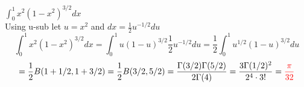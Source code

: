 \item [4.] \( \displaystyle \int_0^1 x^2(1-x^2)^{3/2}dx\)
\\[2mm]Using u-sub let $u=x^2$ and $dx = \frac{1}{2}u^{-1/2}du$
\[
    \int_0^1 x^2(1-x^2)^{3/2}dx
    = \int_0^1 u(1-u)^{3/2}\frac{1}{2}u^{-1/2}du
    = \frac{1}{2}\int_0^1 u^{1/2}(1-u)^{3/2}du
\]
\[
    = \frac{1}{2}B(1+1/2,1+3/2)=\frac{1}{2}B(3/2,5/2)=\frac{\Gamma(3/2)\Gamma(5/2)}{2\Gamma(4)}
    =\frac{3\Gamma(1/2)^2}{2^4\cdot 3!}
    =\textcolor{red}{\frac{\pi}{32}}
\]